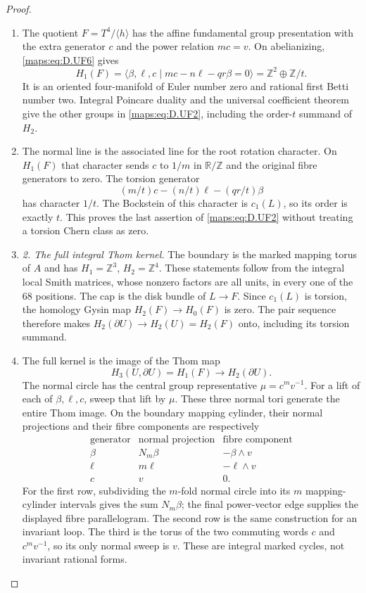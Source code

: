 \begin{proof}
\begin{enumerate}[label=\arabic*.,leftmargin=*]
\item The quotient $F=T^4/\langle h\rangle$ has the affine fundamental
group presentation with the extra generator $c$ and the power
relation $mc=v$. On abelianizing, \eqref{maps:eq:D.UF6} gives
\[
 H_1(F)=\langle\beta,\ell,c\mid
                   mc-n\ell-qr\beta=0\rangle
        =\mathbb Z^2\oplus\mathbb Z/t.                     \tag{D.UF7}\label{maps:eq:D.UF7}
\]
It is an oriented four-manifold of Euler number zero and
rational first Betti number two. Integral Poincare duality and
the universal coefficient theorem give the other groups in
\eqref{maps:eq:D.UF2}, including the order-$t$ summand of $H_2$.

\item The normal line is the associated line for the root rotation
character. On $H_1(F)$ that character sends $c$ to $1/m$ in
$\mathbb R/\mathbb Z$ and the original fibre generators to
zero. The torsion generator
\[
 (m/t)c-(n/t)\ell-(qr/t)\beta
\]
has character $1/t$. The Bockstein of this character is
$c_1(L)$, so its order is exactly $t$. This proves the last
assertion of \eqref{maps:eq:D.UF2} without treating a torsion Chern class as
zero.

\item \emph{2. The full integral Thom kernel.}
The boundary is the marked mapping torus of $A$ and has
$H_1=\mathbb Z^3$, $H_2=\mathbb Z^4$. These statements follow
from the integral local Smith matrices, whose nonzero factors
are all units, in every one of the $68$ positions. The cap is
the disk bundle of $L\to F$. Since $c_1(L)$ is torsion, the
homology Gysin map $H_2(F)\to H_0(F)$ is zero. The pair sequence
therefore makes $H_2(\partial U)\to H_2(U)=H_2(F)$ onto,
including its torsion summand.

\item The full kernel is the image of the Thom map
\[
 H_3(U,\partial U)=H_1(F)\longrightarrow H_2(\partial U).
\]
The normal circle has the central group representative
$\mu=c^m v^{-1}$. For a lift of each of $\beta,\ell,c$, sweep
that lift by $\mu$. These three normal tori generate the
entire Thom image. On the boundary mapping cylinder, their
normal projections and their fibre components are respectively
\[
\begin{array}{c|c|c}
\text{generator}&\text{normal projection}&
                          \text{fibre component}\\\hline
\beta&N_m\beta&-\beta\wedge v\\
\ell&m\ell&-\ell\wedge v\\
c&v&0.
\end{array}                                                  \tag{D.UF8}\label{maps:eq:D.UF8}
\]
For the first row, subdividing the $m$-fold normal circle into
its $m$ mapping-cylinder intervals gives the sum $N_m\beta$;
the final power-vector edge supplies the displayed fibre
parallelogram. The second row is the same construction for an
invariant loop. The third is the torus of the two commuting
words $c$ and $c^m v^{-1}$, so its only normal sweep is $v$.
These are integral marked cycles, not invariant rational
forms.


\end{enumerate}
\end{proof}

